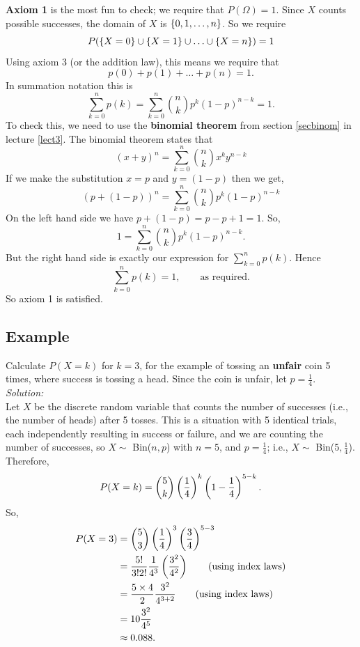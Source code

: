 \noindent \textbf{Axiom 1} is the most fun to check; we require that $P(\Omega) = 1$. Since $X$ counts possible successes, the domain of $X$ is $\left\{0,1,\ldots,n\right\}$. So we require
\[
P(\left\{X = 0\right\} \cup \left\{X = 1\right\} \cup \ldots \cup \left\{X = n\right\}) = 1
\]
Using axiom 3 (or the addition law), this means we require that
\[
p(0) + p(1) + \ldots + p(n) = 1.
\]
In summation notation this is
\[
\sum_{k=0}^n p(k) = \sum_{k=0}^n \binom{n}{k}p^k(1-p)^{n-k} = 1.
\]
To check this, we need to use the \textbf{binomial theorem} from section \ref{secbinom} in lecture \ref{lect3}. The binomial theorem states that
\[
(x+y)^n = \sum_{k=0}^n \binom{n}{k}x^ky^{n-k}
\]
If we make the substitution $x = p$ and $y = (1-p)$ then we get,
\[
(p + (1-p))^n = \sum_{k=0}^n \binom{n}{k}p^k(1-p)^{n-k}
\]
On the left hand side we have $p + (1-p) = p - p + 1 = 1$. So,
\[
1 = \sum_{k=0}^n \binom{n}{k}p^k(1-p)^{n-k}.
\]
But the right hand side is exactly our expression for $\displaystyle{\sum_{k=0}^n p(k)}$. Hence
\[
\sum_{k=0}^n p(k) = 1, \qquad \text{as required.}
\]
So axiom 1 is satisfied.


\subsection{Example}
Calculate $P(X = k)$ for $k = 3$, for the example of tossing an \textbf{unfair} coin 5 times, where success is tossing a head. Since the coin is unfair, let $p = \frac{1}{4}$. \\

\noindent \textit{Solution:} \\
Let $X$ be the discrete random variable that counts the number of successes (i.e., the number of heads) after 5 tosses. This is a situation with 5 identical trials, each independently resulting in success or failure, and we are counting the number of successes, so $X \sim$ Bin($n,p$) with $n = 5$, and $p = \frac{1}{4}$; i.e., $X \sim$ Bin($5,\frac{1}{4}$). Therefore,
\[
P(X = k) = \binom{5}{k}\left(\frac{1}{4}\right)^k\left(1 - \frac{1}{4}\right)^{5-k}.
\]
So,
\begin{align*}
P(X = 3) & = \binom{5}{3}\left(\frac{1}{4}\right)^3\left(\frac{3}{4}\right)^{5-3} \\
	      & = \frac{5!}{3!2!} \frac{1}{4^3}\left(\frac{3^2}{4^2}\right) \tag{using index laws} \\
	      & = \frac{5\times 4}{2} \frac{3^2}{4^{3+2}} \tag{using index laws} \\
	      & = 10\frac{3^2}{4^5} \\
	      & \approx 0.088. 
\end{align*}

